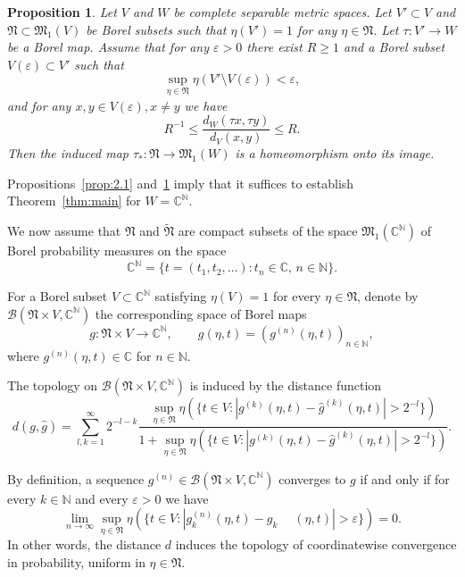 \documentclass[12pt,a4paper]{article}
\newtheorem{proposition}[theorem]{Proposition}
\theoremstyle{definition}
\theoremstyle{remark}
\newcommand{\BB}{\mathscr{B}}
\newcommand{\MM}{{\mathfrak{M}}}
\newcommand{\NN}{{\mathfrak{N}}}
\begin{document}
	\begin{proposition}
		\label{prop:2.2}
		Let $V$ and $W$ be  complete separable metric spaces. Let $V' \subset V$ and $\NN \subset \MM_1(V)$
		be Borel subsets such that $\eta(V') = 1$ for any $\eta \in \NN$. Let $\tau \colon V' \to W$ be a Borel map.
		Assume that for any $\varepsilon > 0$ there exist $R \ge 1$ and a Borel subset $V(\varepsilon) \subset V'$ such that
		\[
		\sup_{\eta \in \NN} \eta(V' \setminus V(\varepsilon)) < \varepsilon,
		\]
		and for any $x, y \in V(\varepsilon), x \ne y$ we have
		\[
		R^{-1} \le \frac{d_W(\tau x, \tau y)}{d_V(x, y)} \le R.
		\]
		Then the induced map $\tau_* \colon \NN \to \MM_1(W)$ is a homeomorphism onto its image.
	\end{proposition}
	
	Propositions~\ref{prop:2.1} and~\ref{prop:2.2} imply that it suffices to establish Theorem~\ref{thm:main}
	for $W = \mathbb{C}^{\mathbb{N}}$.
	
	We now assume that $\NN$ and $\widetilde{\NN}$ are compact subsets of the space $\MM_1(\mathbb{C}^{\mathbb{N}})$
	of Borel probability measures on the space
	\[
	\mathbb{C}^{\mathbb{N}} = \{ t = (t_1, t_2, \ldots) : t_n \in \mathbb{C},\, n \in \mathbb{N} \}.
	\]
	
	
	For a Borel subset $V \subset \mathbb{C}^{\mathbb{N}}$ satisfying $\eta(V) = 1$ for every $\eta \in \NN$,
	denote by $\BB(\NN \times V, \mathbb{C}^{\mathbb{N}})$ the corresponding space of Borel maps
	\[
	g \colon \NN \times V \to \mathbb{C}^{\mathbb{N}}, \qquad
	g(\eta, t) = (g^{(n)}(\eta, t))_{n \in \mathbb{N}},
	\]
	where $g^{(n)}(\eta, t) \in \mathbb{C}$ for $n \in \mathbb{N}$.
	
	The topology on $\BB(\NN \times V, \mathbb{C}^{\mathbb{N}})$ is induced by the distance function
	\[
	d(g, \widehat{g}) =
	\sum_{l,k=1}^{\infty}
	2^{-l-k}
	\frac{\displaystyle\sup_{\eta \in \NN}
		\eta(\{t \in V : |g^{(k)}(\eta, t) - \widehat{g}^{(k)}(\eta, t)| > 2^{-l}\})}
	{1 + \displaystyle\sup_{\eta \in \NN}
		\eta(\{t \in V : |g^{(k)}(\eta, t) - \widehat{g}^{(k)}(\eta, t)| > 2^{-l}\})}.
	\]
	
	By definition, a sequence $g^{(n)} \in \BB(\NN \times V, \mathbb{C}^{\mathbb{N}})$ converges to $g$ if and only if
	for every $k \in \mathbb{N}$ and every $\varepsilon > 0$ we have
	\[
	\lim_{n \to \infty}
	\sup_{\eta \in \NN}
	\eta(\{ t \in V : |g^{(n)}_k(\eta, t) - g^{\phantom{(n)}}_k(\eta, t)| > \varepsilon\})
	= 0.
	\]
	In other words, the distance $d$ induces the topology of coordinatewise convergence in probability, uniform in $\eta \in \NN$.
	
\end{document}
